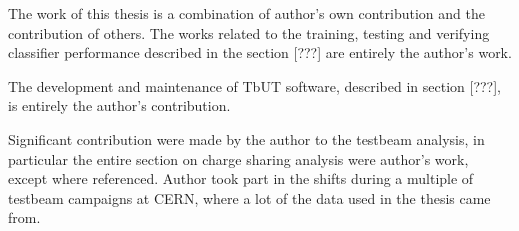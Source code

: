 \noindent The work of this thesis is a combination of author's own contribution and the contribution of others. The works related to the training, testing and verifying classifier performance described in the section [???] are entirely the author's work. 

\noindent The development and maintenance of TbUT software, described in section [???], is entirely the author's contribution. 

\noindent Significant contribution were made by the author to the testbeam analysis, in particular the entire section on charge sharing analysis were author's work, except where referenced. Author took part in the shifts during a multiple of testbeam campaigns at CERN, where a lot of the data used in the thesis came from. 


